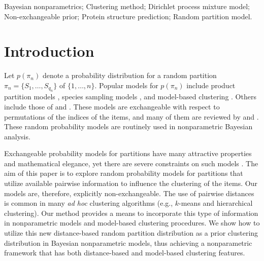 \documentclass[lineno]{biometrika-dbd}
\newcommand{\partition}{\ensuremath{\pi}}
\begin{document}
\begin{keywords}
Bayesian nonparametrics;
Clustering method;
Dirichlet process mixture model;
Non-exchangeable prior;
Protein structure prediction;
Random partition model.
\end{keywords}

\section{Introduction}

Let $p(\partition_n)$ denote a probability distribution for a random partition
$\partition_n = \{S_1,\ldots,S_{q_n}\}$ of $\{1,\ldots,n\}$.  Popular models for
$p(\partition_n)$ include product partition models
\citep[see][]{hart:1990,barr:hart:1992}, species sampling models
\citep[see][]{pitm:1995,pitm:yor:1997}, and model-based clustering
\citep{rich:gree:1997,fral:raft:2002}.  Others include those of
\citet{pitm:2003} and \citet{lijo:mena:prns:2005}.  These models are
exchangeable with respect to permutations of the indices of the items, and many
of them are reviewed by \citet{quin:2006} and \citet{lau:gree:2007}. These
random probability models are routinely used in nonparametric Bayesian
analysis.

Exchangeable probability models for partitions have many attractive properties
and mathematical elegance, yet there are severe constraints on such models
\citep{leej:muel:trip:quin:2010}.  The aim of this paper is to explore random
probability models for partitions that utilize available pairwise information
to influence the clustering of the items.  Our models are, therefore,
explicitly non-exchangeable.  The use of pairwise distances is common in many
\emph{ad hoc} clustering algorithms (e.g., $k$-means and hierarchical
clustering).  Our method provides a means to incorporate this type of
information in nonparametric models and model-based clustering procedures.  We
show how to utilize this new distance-based random partition distribution as a
prior clustering distribution in Bayesian nonparametric models, thus achieving
a nonparametric framework that has both distance-based and model-based
clustering features.
\end{document}
